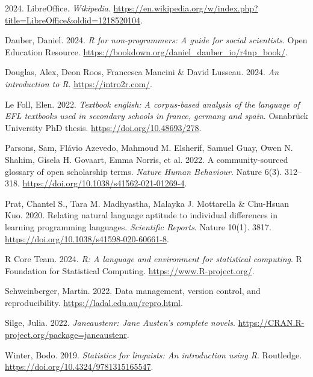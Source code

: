 \documentclass[
  letterpaper,
  DIV=11,
  numbers=noendperiod]{scrreprt}
\newlength{\cslhangindent}
\newenvironment{CSLReferences}[2] %
 {\begin{list}{}{%
  \setlength{\itemindent}{0pt}
  \setlength{\leftmargin}{0pt}
  \setlength{\parsep}{0pt}
  \ifodd #1
   \setlength{\leftmargin}{\cslhangindent}
   \setlength{\itemindent}{-1\cslhangindent}
  \fi
  \setlength{\itemsep}{#2\baselineskip}}}
 {\end{list}}
\begin{document}
\label{refs}
\begin{CSLReferences}{1}{0}
2024. LibreOffice. \emph{Wikipedia}.
\url{https://en.wikipedia.org/w/index.php?title=LibreOffice&oldid=1218520104}.

Dauber, Daniel. 2024. \emph{R for non-programmers: A guide for social
scientists}. Open Education Resource.
\url{https://bookdown.org/daniel_dauber_io/r4np_book/}.

Douglas, Alex, Deon Roos, Francesca Mancini \& David Lusseau. 2024.
\emph{An introduction to {R}}. \url{https://intro2r.com/}.

Le Foll, Elen. 2022. \emph{Textbook english: A corpus-based analysis of
the language of EFL textbooks used in secondary schools in france,
germany and spain}. Osnabrück University PhD thesis.
\url{https://doi.org/10.48693/278}.

Parsons, Sam, Flávio Azevedo, Mahmoud M. Elsherif, Samuel Guay, Owen N.
Shahim, Gisela H. Govaart, Emma Norris, et al. 2022. A community-sourced
glossary of {open} {scholarship} terms. \emph{Nature Human Behaviour}.
Nature 6(3). 312--318. \url{https://doi.org/10.1038/s41562-021-01269-4}.

Prat, Chantel S., Tara M. Madhyastha, Malayka J. Mottarella \& Chu-Hsuan
Kuo. 2020. Relating natural language aptitude to individual differences
in learning programming languages. \emph{Scientific Reports}. Nature
10(1). 3817. \url{https://doi.org/10.1038/s41598-020-60661-8}.

R Core Team. 2024. \emph{R: A language and environment for statistical
computing}. R Foundation for Statistical Computing.
\url{https://www.R-project.org/}.

Schweinberger, Martin. 2022. Data management, version control, and
reproducibility. \url{https://ladal.edu.au/repro.html}.

Silge, Julia. 2022. \emph{Janeaustenr: Jane {Austen}'s complete novels}.
\url{https://CRAN.R-project.org/package=janeaustenr}.

Winter, Bodo. 2019. \emph{Statistics for linguists: An introduction
using {R}}. Routledge. \url{https://doi.org/10.4324/9781315165547}.

\end{CSLReferences}
\end{document}
